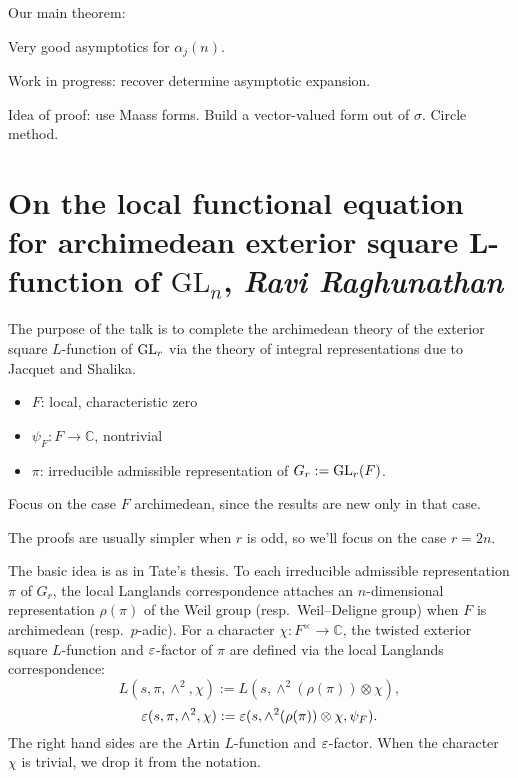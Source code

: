 \documentclass[reqno]{amsart} 
\begin{document}
Our main theorem:
\begin{theorem}
  Very good asymptotics for $\alpha_j(n)$.
\end{theorem}

Work in progress: recover determine asymptotic expansion.

Idea of proof: use Maass forms.  Build a vector-valued form out of $\sigma$.  Circle method.


\section{On the local functional equation for archimedean exterior square L-function of $\mathrm{GL}_n$, \textnormal{\emph{Ravi Raghunathan}}}

The purpose of the talk is to complete the archimedean theory of the exterior square $L$-function of $\operatorname{GL}_r$ via the theory of integral representations due to Jacquet and Shalika.
\begin{itemize}
\item $F$: local, characteristic zero
\item $\psi_F : F \rightarrow \mathbb{C}$, nontrivial
\item $\pi$: irreducible admissible representation of $G_r := \operatorname{GL}_r(F)$.
\end{itemize}
Focus on the case $F$ archimedean, since the results are new only in that case.

The proofs are usually simpler when $r$ is odd, so we'll focus on the case $r = 2 n$.

The basic idea is as in Tate's thesis.  To each irreducible admissible representation $\pi$ of $G_r$, the local Langlands correspondence attaches an $n$-dimensional representation $\rho(\pi)$ of the Weil group (resp.\ Weil--Deligne group) when $F$ is archimedean (resp.\ $p$-adic).  For a character $\chi : F^\times \rightarrow \mathbb{C}$, the twisted exterior square $L$-function and $\varepsilon$-factor of $\pi$ are defined via the local Langlands correspondence:
\begin{equation*}
  L(s, \pi, \wedge^2, \chi) := L(s, \wedge^2(\rho(\pi)) \otimes \chi),
\end{equation*}
\begin{equation*}
  \varepsilon(s, \pi, \wedge^2, \chi) := \varepsilon(s, \wedge^2(\rho(\pi)) \otimes \chi, \psi_F).
\end{equation*}
The right hand sides are the Artin $L$-function and $\varepsilon$-factor.  When the character $\chi$ is trivial, we drop it from the notation.
\end{document}
